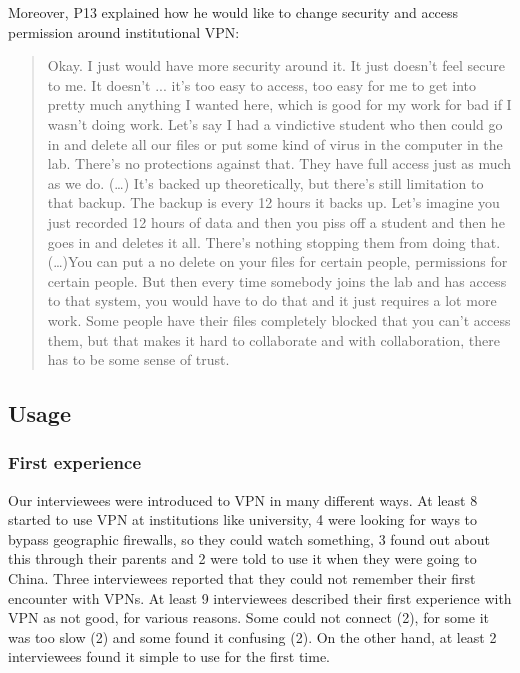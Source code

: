 Moreover, P13 explained how he would like to change security and access permission around institutional VPN:
\begin{quote}Okay. I just would have more security around it. It just doesn't feel secure to me. It doesn't ... it's too easy to access, too easy for me to get into pretty much anything I wanted here, which is good for my work for bad if I wasn't doing work. Let's say I had a vindictive student who then could go in and delete all our files or put some kind of virus in the computer in the lab. There's no protections against that. They have full access just as much as we do. (…) It's backed up theoretically, but there's still limitation to that backup. The backup is every 12 hours it backs up. Let's imagine you just recorded 12 hours of data and then you piss off a student and then he goes in and deletes it all. There's nothing stopping them from doing that. 
(\dots)You can put a no delete on your files for certain people, permissions for certain people. But then every time somebody joins the lab and has access to that system, you would have to do that and it just requires a lot more work. Some people have their files completely blocked that you can't access them, but that makes it hard to collaborate and with collaboration, there has to be some sense of trust.\end{quote}



\subsection{Usage}
\subsubsection{First experience}
Our interviewees were introduced to VPN in many different ways. At least 8 started to use VPN at institutions like university, 4 were looking for ways to bypass geographic firewalls, so they could watch something, 3 found out about this through their parents and 2 were told to use it when they were going to China. Three interviewees reported that they could not remember their first encounter with VPNs.  
At least 9 interviewees described their first experience with VPN as not good, for various reasons. Some could not connect (2), for some it was too slow (2) and some found it confusing (2).  On the other hand, at least 2 interviewees found it simple to use for the first time.



